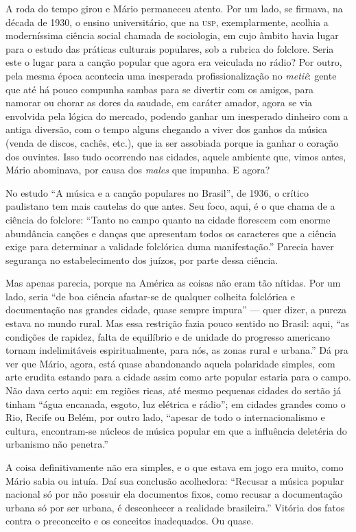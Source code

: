 A roda do tempo girou e Mário permaneceu atento. Por um lado, se
firmava, na década de 1930, o ensino universitário, que na \textsc{usp},
exemplarmente, acolhia a moderníssima ciência social chamada de
sociologia, em cujo âmbito havia lugar para o estudo das práticas
culturais populares, sob a rubrica do folclore. Seria este o lugar
para a canção popular que agora era veiculada no rádio? Por outro, pela
mesma época acontecia uma inesperada profissionalização no \textit{metiê}: gente
que até há pouco compunha sambas para se divertir com os amigos, para
namorar ou chorar as dores da saudade, em caráter amador, agora se via
envolvida pela lógica do mercado, podendo ganhar um inesperado dinheiro
com a antiga diversão, com o tempo alguns chegando a viver dos ganhos da
música (venda de discos, cachês, etc.), que ia ser assobiada porque ia
ganhar o coração dos ouvintes. Isso tudo ocorrendo nas cidades, aquele
ambiente que, vimos antes, Mário abominava, por causa dos \textit{males} que
impunha. E agora?

No estudo ``A música e a canção populares no Brasil'', de 1936, o
crítico paulistano tem mais cautelas do que antes. Seu foco, aqui, é o
que chama de a ciência do folclore: ``Tanto no campo quanto na cidade
florescem com enorme abundância canções e danças que apresentam todos os
caracteres que a ciência exige para determinar a validade folclórica
duma manifestação.'' Parecia haver segurança no estabelecimento dos
juízos, por parte dessa ciência.

Mas apenas parecia, porque na América as coisas não eram tão nítidas.
Por um lado, seria ``de boa ciência afastar-se de qualquer colheita
folclórica e documentação nas grandes cidade, quase sempre impura'' ---
quer dizer, a pureza estava no mundo rural. Mas essa restrição fazia
pouco sentido no Brasil: aqui, ``as condições de rapidez, falta de
equilíbrio e de unidade do progresso americano tornam indelimitáveis
espiritualmente, para nós, as zonas rural e urbana.'' Dá pra ver que
Mário, agora, está quase abandonando aquela polaridade simples, com arte
erudita estando para a cidade assim como arte popular estaria para o
campo. Não dava certo aqui: em regiões ricas, até mesmo pequenas cidades
do sertão já tinham ``água encanada, esgoto, luz elétrica e rádio''; em
cidades grandes como o Rio, Recife ou Belém, por outro lado, ``apesar de
todo o internacionalismo e cultura, encontram-se núcleos de música
popular em que a influência deletéria do urbanismo não penetra.''

A coisa definitivamente não era simples, e o que estava em jogo era
muito, como Mário sabia ou intuía. Daí sua conclusão acolhedora:
``Recusar a música popular nacional só por não possuir ela documentos
fixos, como recusar a documentação urbana só por ser urbana, é
desconhecer a realidade brasileira.'' Vitória dos fatos contra o
preconceito e os conceitos inadequados. Ou quase.

